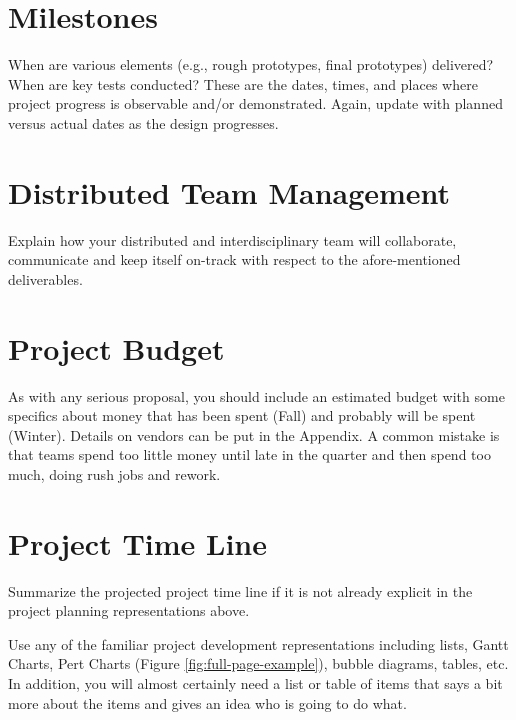 \section{Milestones}
When are various elements (e.g., rough prototypes, final prototypes) delivered? When are key tests conducted? These are the dates, times, and places where project progress is observable and/or demonstrated. Again, update with planned versus actual dates as the design progresses.

\section{Distributed Team Management}
Explain how your distributed and interdisciplinary team will collaborate, communicate and keep itself on-track with respect to the afore-mentioned deliverables.

\section{Project Budget}
As with any serious proposal, you should include an estimated budget with some specifics about money that has been spent (Fall) and probably will be spent (Winter). Details on vendors can be put in the Appendix. A common mistake is that teams spend too little money until late in the quarter and then spend too much, doing rush jobs and rework.

\section{Project Time Line}
Summarize the projected project time line if it is not already explicit in the project planning representations above.

Use any of the familiar project development representations including lists, Gantt Charts, Pert Charts (Figure \ref{fig:full-page-example}), bubble diagrams, tables, etc. In addition, you will almost certainly need a list or table of items that says a bit
more about the items and gives an idea who is going to do what.

